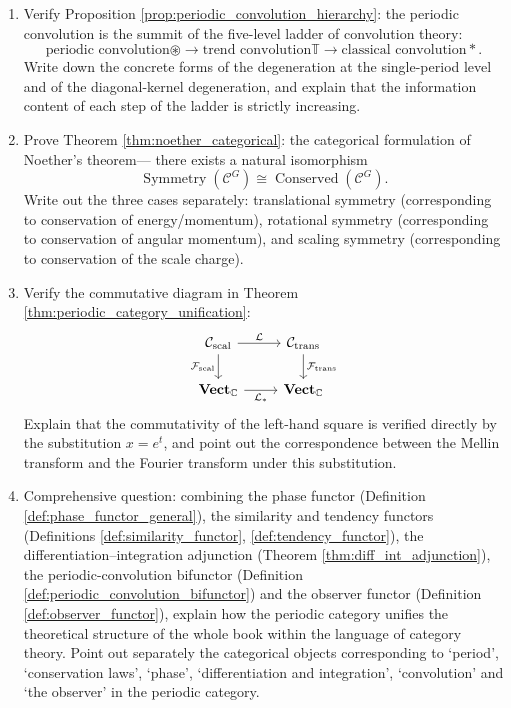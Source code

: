 \begin{enumerate}[leftmargin=3em, label=\textbf{Exercise \arabic*}]
    \item Verify Proposition \ref{prop:periodic_convolution_hierarchy}:
    the periodic convolution is the summit of the five-level ladder of convolution theory:
    \[
    \text{periodic convolution}\circledast\to
    \text{trend convolution}\mathbb{T}\to
    \text{classical convolution}*.
    \]
    Write down the concrete forms of the degeneration at the single-period level and of the diagonal-kernel degeneration,
    and explain that the information content of each step of the ladder is strictly increasing.

    \item Prove Theorem \ref{thm:noether_categorical}:
    the categorical formulation of Noether's theorem---
    there exists a natural isomorphism
    \[
    \operatorname{Symmetry}(\mathcal{C}^G)\cong\operatorname{Conserved}(\mathcal{C}^G).
    \]
    Write out the three cases separately: translational symmetry (corresponding to conservation of energy/momentum),
    rotational symmetry (corresponding to conservation of angular momentum),
    and scaling symmetry (corresponding to conservation of the scale charge).

    \item Verify the commutative diagram in Theorem \ref{thm:periodic_category_unification}:
    \[
    \begin{tikzcd}
    \mathcal{C}_{\text{scal}} \arrow[r,"\mathcal{L}"] \arrow[d,"\mathcal{F}_{\text{scal}}"']
    & \mathcal{C}_{\text{trans}} \arrow[d,"\mathcal{F}_{\text{trans}}"] \\
    \mathbf{Vect}_{\mathbb{C}} \arrow[r,"\mathcal{L}_*"']
    & \mathbf{Vect}_{\mathbb{C}}
    \end{tikzcd}
    \]
    Explain that the commutativity of the left-hand square is verified directly by the substitution $x=e^t$,
    and point out the correspondence between the Mellin transform and the Fourier transform under this substitution.

    \item Comprehensive question: combining the phase functor (Definition \ref{def:phase_functor_general}),
    the similarity and tendency functors (Definitions \ref{def:similarity_functor}, \ref{def:tendency_functor}),
    the differentiation--integration adjunction (Theorem \ref{thm:diff_int_adjunction}),
    the periodic-convolution bifunctor (Definition \ref{def:periodic_convolution_bifunctor})
    and the observer functor (Definition \ref{def:observer_functor}),
    explain how the periodic category unifies the theoretical structure of the whole book within the language of category theory.
    Point out separately the categorical objects corresponding to `period', `conservation laws', `phase', `differentiation and integration', `convolution' and `the observer'
    in the periodic category.
\end{enumerate}
